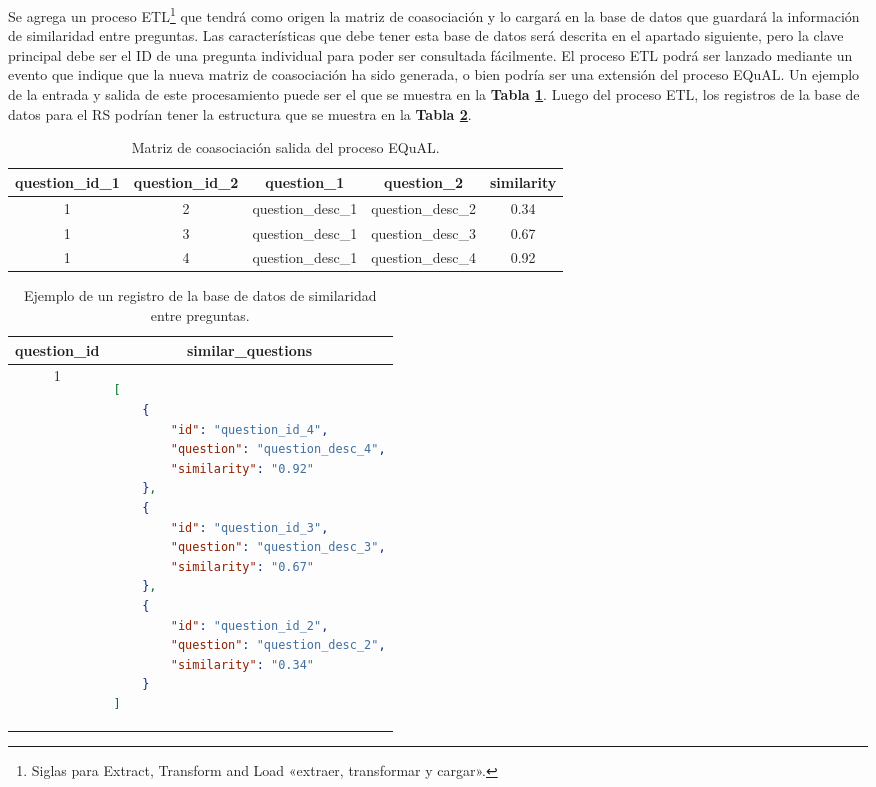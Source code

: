 \bigskip Se agrega un proceso ETL\footnote{Siglas para Extract, Transform and Load «extraer, transformar y cargar».} que tendrá como origen la matriz de coasociación y lo cargará en la base de datos que guardará la información de similaridad entre preguntas.  Las características que debe tener esta base de datos será descrita en el apartado siguiente, pero la clave principal debe ser el ID de una pregunta individual para poder ser consultada fácilmente. El proceso ETL podrá ser lanzado mediante un evento que indique que la nueva matriz de coasociación ha sido generada, o bien podría ser una extensión del proceso EQuAL. Un ejemplo de la entrada y salida de este procesamiento puede ser el que se muestra en la \textbf{Tabla \ref{tab:table-co-asociation}}. Luego del proceso ETL, los registros de la base de datos para el RS podrían tener la estructura que se muestra en la \textbf{Tabla \ref{tab:table-similar-questions}}.

\begin{table}[]
	\centering
	\begin{tabular}{|c|c|c|c|c|}
		\hline
		\textbf{question\_id\_1} & \textbf{question\_id\_2} & \textbf{question\_1} & \textbf{question\_2} & \textbf{similarity} \\ \hline
		1 & 2 & question\_desc\_1 & question\_desc\_2 & 0.34 \\ \hline
		1 & 3 & question\_desc\_1 & question\_desc\_3 & 0.67 \\ \hline
		1 & 4 & question\_desc\_1 & question\_desc\_4 & 0.92 \\ \hline
	\end{tabular}
	\caption{Matriz de coasociación salida del proceso EQuAL.}
	\label{tab:table-co-asociation}
\end{table}

\begin{table}[]
	\centering
	\begin{tabular}{|c|l|}
		\hline
		\textbf{question\_id} &
		\multicolumn{1}{c|}{\textbf{similar\_questions}} \\ \hline
		1 & \begin{lstlisting}[language=json]
[
	{
		"id": "question_id_4",
		"question": "question_desc_4",
		"similarity": "0.92"
	},
	{
		"id": "question_id_3",
		"question": "question_desc_3",
		"similarity": "0.67"
	},
	{
		"id": "question_id_2",
		"question": "question_desc_2",
		"similarity": "0.34"
	}
]
		\end{lstlisting} \\ \hline
	\end{tabular}
	\caption{Ejemplo de un registro de la base de datos de similaridad entre preguntas.}
	\label{tab:table-similar-questions}
\end{table}

